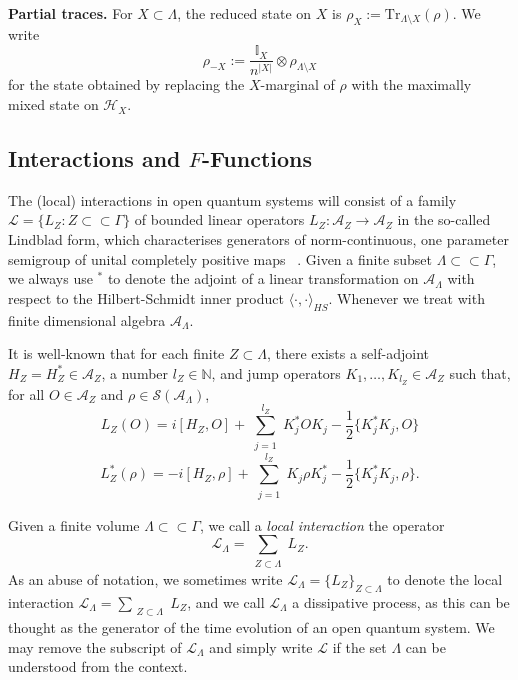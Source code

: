 \documentclass[11pt]{article}
\numberwithin{equation}{section}
\numberwithin{figure}{section}
\numberwithin{table}{section}
\theoremstyle{definition}
\theoremstyle{plain}
\theoremstyle{remark}
\newcommand{\Id}{\mathbb{I}}
\newcommand{\Li}{\mathcal{L}}
\newcommand{\A}{\mathcal{A}}
\newcommand{\La}{\Lambda}
\newcommand{\G}{\Gamma}
\newcommand{\summ}[1]{\sum\limits_{\substack{ #1 }}}
\begin{document}
\medskip

\noindent\textbf{Partial traces.} For $X \subset \Lambda$, the reduced state on $X$ is $\rho_X := \mathrm{Tr}_{\Lambda \setminus X}(\rho)$. 
We write
\begin{equation}
    \rho_{-X} := \frac{\Id_X}{n^{|X|}} \otimes \rho_{\Lambda \setminus X}
    \label{eq:partialTrace}
\end{equation}
for the state obtained by replacing the $X$-marginal of $\rho$ with the maximally mixed state on $\mathcal{H}_X$.



\subsection{Interactions and $F$-Functions}

The (local) interactions in open quantum systems will consist of a family $\Li=\{L_Z:Z\subset \subset \G\}$ of bounded linear operators $L_Z:\A_Z\to\A_Z$ in the so-called Lindblad form, which characterises generators of norm-continuous, one parameter semigroup of unital completely positive maps ~\cite{breuer_theory_2002, manzano_short_2020}. 
Given a finite subset $\La\subset\subset \G$, we always use $^*$ to denote the adjoint of a linear transformation on $\A_\La$ with respect to the Hilbert-Schmidt inner product $\langle \cdot,\cdot \rangle_{HS}$. Whenever we treat with finite dimensional algebra $\A_\La$.

It is well-known \cite{Gorini:1975nb,lindblad_generators_1976} that for each finite $Z\subset \La$, there exists a self-adjoint $H_Z=H_Z^*\in \A_Z$,  a number $l_Z\in\mathbb{N}$, and jump operators $K_1,\dots,K_{l_Z}\in\A_Z$ such that, for all $O\in\A_Z$ and $\rho\in\mathcal{S}(\A_\La)$,
\begin{equation}
    L_Z(O)=i[H_Z,O]+\summ{j=1}^{l_Z}K_j^*OK_j-\frac 12 \{K_j^*K_j,O\}
    \end{equation}
\begin{equation}
    L_Z^*(\rho)=-i[H_Z,\rho]+\summ{j=1}^{l_Z}K_j\rho K_j^*-\frac 12 \{K_j^* K_j,\rho\}.
\end{equation}

Given a finite volume $\La\subset\subset\G$, we call a \textit{local interaction} the operator
\begin{equation}
    \Li_\La=\summ{Z\subset \La}L_Z.
    \label{eq:localInteraction}
\end{equation}
As an abuse of notation, we sometimes write $\Li_\La=\{L_Z\}_{Z\subset \La}$ to denote the local interaction $\Li_\La=\summ{Z\subset \La}L_Z$, and we call $\Li_\La$ a dissipative process, as this can be thought as the generator of the time evolution of an open quantum system. We may remove the subscript of $\Li_\La$ and simply write $\Li$ if the set $\La$ can be understood from the context. 
\end{document}
